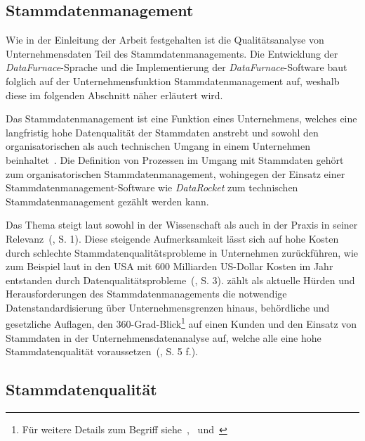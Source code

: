 \documentclass[
  language=german, %
  type=bachelor,%
  ngerman
]{isthesis}
\begin{document}
\begin{content}
  \section{Stammdatenmanagement}\label{sec:stammdatenmanagement}

	Wie in der Einleitung der Arbeit festgehalten ist die Qualitätsanalyse von
	Unternehmensdaten Teil des Stammdatenmanagements. Die Entwicklung der
	\textit{DataFurnace}-Sprache und die Implementierung der
	\textit{DataFurnace}-Software baut folglich auf der Unternehmensfunktion
	Stammdatenmanagement auf, weshalb diese im folgenden Abschnitt näher erläutert
	wird.

	Das Stammdatenmanagement ist eine Funktion eines Unternehmens, welches eine
	langfristig hohe Datenqualität der Stammdaten anstrebt und sowohl den
	organisatorischen als auch technischen Umgang in einem Unternehmen
	beinhaltet~\cite[][S.  2]{legner2007stammdaten}.  Die Definition von
	Prozessen im Umgang mit Stammdaten gehört \zB{} zum organisatorischen
	Stammdatenmanagement, wohingegen der Einsatz einer Stammdatenmanagement-Software
	wie \textit{DataRocket} zum technischen Stammdatenmanagement gezählt werden
	kann.  

	Das Thema steigt laut \textsc{\citeauthor{otto2012design}} sowohl in der
	Wissenschaft als auch in der Praxis in seiner
	Relevanz~(\citeyear{otto2012design}, S. 1). Diese steigende Aufmerksamkeit
	lässt sich auf hohe Kosten durch schlechte Stammdatenqualitätsprobleme in
	Unternehmen zurückführen, wie zum Beispiel laut
	\textsc{\citeauthor{eckerson2002data}} in den USA mit 600 Milliarden
	US-Dollar Kosten im Jahr entstanden durch
	Datenqualitätsprobleme~(\citeyear{eckerson2002data}, S. 3).
	\textsc{\citeauthor{otto2011stammdatenmanagement}} zählt als aktuelle Hürden
	und Herausforderungen des Stammdatenmanagements die notwendige
	Datenstandardisierung über Unternehmensgrenzen hinaus, behördliche und
	gesetzliche Auflagen, den 360-Grad-Blick\footnote{Für weitere Details zum
	Begriff siehe~\cite{kotorov2003customer},~\cite{otto2016datenqualitat}
	und~\cite{otto2016master}} auf einen Kunden und den Einsatz von Stammdaten in
	der Unternehmensdatenanalyse auf, welche alle eine hohe Stammdatenqualität
	voraussetzen~(\citeyear{otto2011stammdatenmanagement}, S. 5 f.).
	

	\subsection{Stammdatenqualität}\label{subsec:stammdatenqualität}
	

\end{content}
\end{document}

